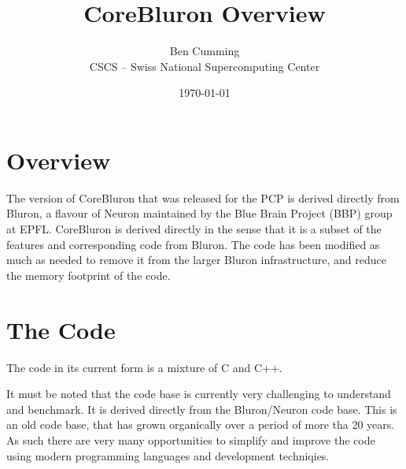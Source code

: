 \documentclass[11pt,a4paper]{article}
\begin{document}
\title{CoreBluron Overview}
\author{Ben Cumming\\CSCS -- Swiss National Supercomputing Center}
\date{\today}
\maketitle


\section{Overview}
The version of CoreBluron that was released for the PCP is derived directly from Bluron, a flavour of Neuron maintained by the Blue Brain Project (BBP) group at EPFL. CoreBluron is derived directly in the sense that it is a subset of the features and corresponding code from Bluron. The code has been modified as much as needed to remove it from the larger Bluron infrastructure, and reduce the memory footprint of the code.

\section{The Code}
The code in its current form is a mixture of C and C++.

It must be noted that the code base is currently very challenging to understand and benchmark. It is derived directly from the Bluron/Neuron code base. This is an old code base, that has grown organically over a period of more tha 20 years. As such there are very many opportunities to simplify and improve the code using modern programming languages and development techniqies.
\end{document}
